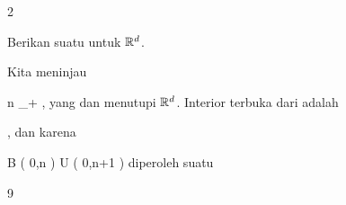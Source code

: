 {2}

{

Berikan suatu
untuk ${\mathbb R}^d$.

}
{

Kita meninjau

 {}
 {n \in \N_+} {}
 {} {} {} {,}
yang
dan menutupi ${\mathbb R}^d$. Interior terbuka dari
adalah

, dan karena

\mavergleichskettedisp
{\vergleichskette
{ B  \left(  0,n \right)
}
{ \subseteq} { U \left(   0,n+1  \right)
}
{ } {
}
{ } {
}
{ } {
}
}
{}{}{}
diperoleh suatu

 }



{9}

